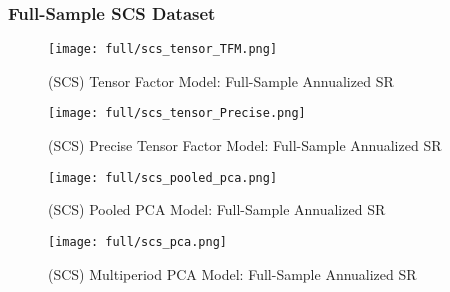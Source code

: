 \subsubsection{Full-Sample SCS Dataset}

\begin{figure}[H]
    \centering
    \texttt{[image: full/scs\_tensor\_TFM.png]}
    \caption{(SCS) Tensor Factor Model: Full-Sample Annualized SR}
    \label{fig:scs-primary-tfm}
\end{figure}

\begin{figure}[H]
    \centering
    \texttt{[image: full/scs\_tensor\_Precise.png]}
    \caption{(SCS) Precise Tensor Factor Model: Full-Sample Annualized SR}
    \label{fig:scs-primary-precise}
\end{figure}

\begin{figure}[H]
    \centering
    \texttt{[image: full/scs\_pooled\_pca.png]}
    \caption{(SCS) Pooled PCA Model: Full-Sample Annualized SR}
    \label{fig:scs-primary-pooled-pca}
\end{figure}

\begin{figure}[H]
    \centering
    \texttt{[image: full/scs\_pca.png]}
    \caption{(SCS) Multiperiod PCA Model: Full-Sample Annualized SR}
    \label{fig:scs-primary-pca}
\end{figure}
